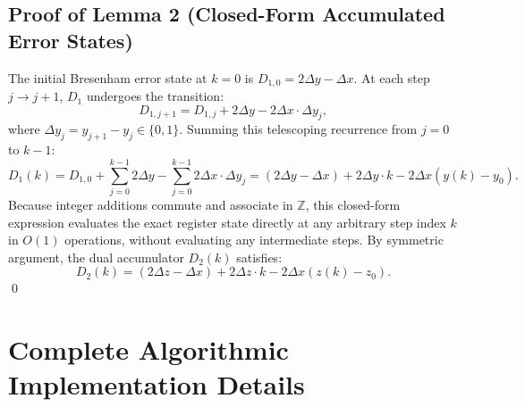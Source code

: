 \documentclass[11pt]{article}
\begin{document}
\subsection{Proof of Lemma 2 (Closed-Form Accumulated Error States)}
The initial Bresenham error state at $k=0$ is $D_{1,0} = 2\Delta y - \Delta x$. At each step $j \to j+1$, $D_1$ undergoes the transition:
\begin{equation}
    D_{1,j+1} = D_{1,j} + 2\Delta y - 2\Delta x \cdot \Delta y_j,
\end{equation}
where $\Delta y_j = y_{j+1} - y_j \in \{0, 1\}$. Summing this telescoping recurrence from $j=0$ to $k-1$:
\begin{equation}
    D_1(k) = D_{1,0} + \sum_{j=0}^{k-1} 2\Delta y - \sum_{j=0}^{k-1} 2\Delta x \cdot \Delta y_j = (2\Delta y - \Delta x) + 2\Delta y \cdot k - 2\Delta x (y(k) - y_0).
\end{equation}
Because integer additions commute and associate in $\mathbb{Z}$, this closed-form expression evaluates the exact register state directly at any arbitrary step index $k$ in $O(1)$ operations, without evaluating any intermediate steps. By symmetric argument, the dual accumulator $D_2(k)$ satisfies:
\begin{equation}
    D_2(k) = (2\Delta z - \Delta x) + 2\Delta z \cdot k - 2\Delta x (z(k) - z_0).
\end{equation}
\qed

\section{Complete Algorithmic Implementation Details}
\label{sec:si_algo}
\end{document}
